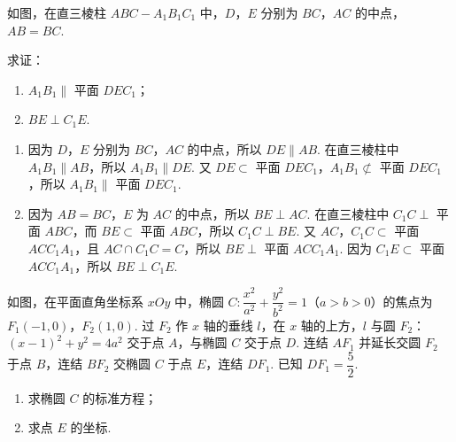 \begin{problem}
如图，在直三棱柱 \(ABC-A_1B_1C_1\) 中，\(D\)，\(E\) 分别为 \(BC\)，\(AC\) 的中点，\(AB=BC\).

求证：

\begin{enumerate}
\item \(A_1B_1\parallel\) 平面 \(DEC_1\)；
\item \(BE\perp C_1E\).
\end{enumerate}

\begin{center}
\end{center}

\end{problem}

\begin{solution}
\begin{enumerate}
\item 因为 \(D\)，\(E\) 分别为 \(BC\)，\(AC\) 的中点，所以 \(DE\parallel AB\). 在直三棱柱中 \(A_1B_1\parallel AB\)，所以 \(A_1B_1\parallel DE\). 又 \(DE\subset\) 平面 \(DEC_1\)，\(A_1B_1\not\subset\) 平面 \(DEC_1\)，所以 \(A_1B_1\parallel\) 平面 \(DEC_1\).
\item 因为 \(AB=BC\)，\(E\) 为 \(AC\) 的中点，所以 \(BE\perp AC\). 在直三棱柱中 \(C_1C\perp\) 平面 \(ABC\)，而 \(BE\subset\) 平面 \(ABC\)，所以 \(C_1C\perp BE\). 又 \(AC\)，\(C_1C\subset\) 平面 \(ACC_1A_1\)，且 \(AC\cap C_1C=C\)，所以 \(BE\perp\) 平面 \(ACC_1A_1\). 因为 \(C_1E\subset\) 平面 \(ACC_1A_1\)，所以 \(BE\perp C_1E\).
\end{enumerate}
\end{solution}

\begin{problem}
如图，在平面直角坐标系 \(xOy\) 中，椭圆 \(C:\dfrac{x^2}{a^2}+\dfrac{y^2}{b^2}=1\)（\(a>b>0\)）的焦点为 \(F_1(-1,0)\)，\(F_2(1,0)\). 过 \(F_2\) 作 \(x\) 轴的垂线 \(l\)，在 \(x\) 轴的上方，\(l\) 与圆 \(F_2\)：\((x-1)^2+y^2=4a^2\) 交于点 \(A\)，与椭圆 \(C\) 交于点 \(D\). 连结 \(AF_1\) 并延长交圆 \(F_2\) 于点 \(B\)，连结 \(BF_2\) 交椭圆 \(C\) 于点 \(E\)，连结 \(DF_1\). 已知 \(DF_1=\dfrac52\).

\begin{enumerate}
\item 求椭圆 \(C\) 的标准方程；
\item 求点 \(E\) 的坐标.
\end{enumerate}


\end{problem}

